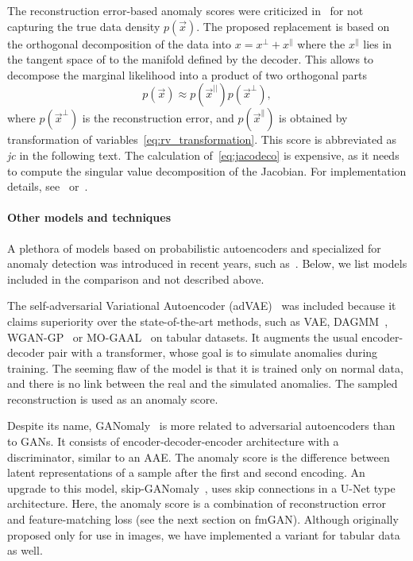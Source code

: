 The reconstruction error-based anomaly scores were criticized in~\cite{pidhorskyi2018generative}  for not capturing the true data density $p(\vec{x}).$ The proposed replacement is based on the orthogonal decomposition of the data into $x=x^\bot +x^{\parallel} $ where the $x^\parallel$  lies in the tangent space of to the manifold defined by the decoder. This allows to decompose the marginal likelihood into a product of two orthogonal parts
\begin{equation}
    p(\vec{x}) \approx p(\vec{x}^{||})p(\vec{x}^{\perp}),
\label{eq:jacodeco}
\end{equation}
where $p(\vec{x}^\bot)$ is the reconstruction error, and $p(\vec{x}^\parallel)$ is obtained by transformation of variables~\eqref{eq:rv_transformation}. This score is abbreviated as \textit{jc} in the following text. The calculation of~\eqref{eq:jacodeco} is expensive, as it needs to compute the singular value decomposition of the Jacobian. For implementation details, see~\cite{pidhorskyi2018generative} or~\cite{vsmidl2019anomaly}.

\paragraph{Other models and techniques}
 A plethora of models based on probabilistic autoencoders and specialized for anomaly detection was introduced in recent years, such as~\cite{zong2018deep, pereira2018unsupervised, xu2018unsupervised, principi2017acoustic, chen2018unsupervised, chalapathyGroupAnomalyDetection2018}. Below, we list models included in the comparison and not described above.

The self-adversarial Variational Autoencoder (adVAE)~\cite{wang2020advae} was included because it claims superiority over the state-of-the-art methods, such as VAE, DAGMM~\cite{zong2018deep}, WGAN-GP~\cite{gulrajani2017improved} or MO-GAAL~\cite{liu2019generative} on tabular datasets. It augments the usual encoder-decoder pair with a transformer, whose goal is to simulate anomalies during training. The seeming flaw of the model is that it is trained only on normal data, and there is no link between the real and the simulated anomalies. The sampled reconstruction is used as an anomaly score.

Despite its name, GANomaly~\cite{akcay2018ganomaly, ahnDeepGenerativeModelsBased2020} is more related to adversarial autoencoders than to GANs. It consists of encoder-decoder-encoder architecture with a discriminator, similar to an AAE. The anomaly score is the difference between latent representations of a sample after the first and second encoding. An upgrade to this model, skip-GANomaly~\cite{akcay2019skip}, uses skip connections in a U-Net type architecture. Here, the anomaly score is a combination of reconstruction error and feature-matching loss (see the next section on fmGAN). Although originally proposed only for use in images, we have implemented a variant for tabular data as well.  


